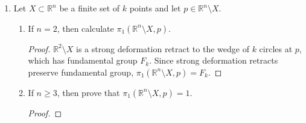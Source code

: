 \documentclass{article}
\begin{document}
\begin{enumerate}[label={\bf Q\arabic*:}]
\begin{enumerate}
        \begin{proof}
          A free group of rank $n$ is a cover of wedge of $n$ loops, i.e.
          $F_n=\pi_1(X,p)$, where
          \begin{equation*}
            X = \underbrace{S^1\vee\ldots\vee S^1}_{n\;\text{times}}.
          \end{equation*}
          Now since $G$ is a subgroup of $F_n$, by the one-to-one
          correspondence between subgroups of fundamental groups and
          connected covers, there is a connected cover $\tilde{X_G}$ of $X$
          such that $\pi_1(\tilde{X_G})=G$. Now from Hatcher, we know that
          a connected cover of a graph is also a graph, and the also the
          degree of the cover will equal to the index $r=[F_n:G]$ of the
          subgroup $G$ of $F_n$. Hence the connected cover will be a graph
          with $r$ vertices and $nr$ edges. Now from the previous part of
          this question, such a graph will have a rank of $m=1-r+nr$.
        \end{proof}
    \end{enumerate}

  \item Let $X\subset\mathbb{R}^n$ be a finite set of $k$ points and let
    $p\in\mathbb{R}^n\setminus X$.
    \begin{enumerate}
      \item If $n=2$, then calculate $\pi_1(\mathbb{R}^n\setminus X,p)$.
        \begin{proof}
          $\mathbb{R}^2\setminus X$ is a strong deformation retract to the
          wedge of $k$ circles at $p$, which has fundamental group $F_k$.
          Since strong deformation retracts preserve fundamental group,
          $\pi_1(\mathbb{R}^n\setminus X,p)=F_k$.
        \end{proof}

      \item If $n\geq3$, then prove that $\pi_1(\mathbb{R}^n\setminus
        X,p)=1$.
        \begin{proof}
        \end{proof}
    \end{enumerate}
\end{enumerate}
\end{document}
